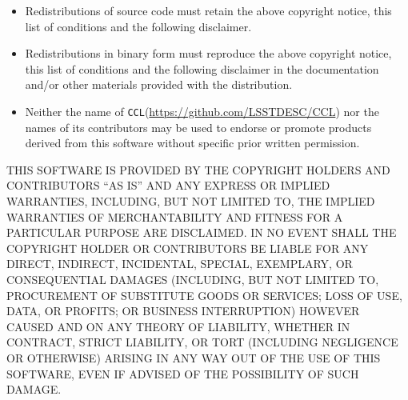 \documentclass[\docopts]{\docclass}
\newcommand{\ccl}{{\tt CCL}\xspace}
\begin{document}
\begin{itemize}
\item Redistributions of source code must retain the above copyright notice, this
  list of conditions and the following disclaimer.
\item Redistributions in binary form must reproduce the above copyright notice,
  this list of conditions and the following disclaimer in the documentation
  and/or other materials provided with the distribution.
\item Neither the name of \ccl (\url{https://github.com/LSSTDESC/CCL}) nor the names of its
  contributors may be used to endorse or promote products derived from
  this software without specific prior written permission.
\end{itemize}

THIS SOFTWARE IS PROVIDED BY THE COPYRIGHT HOLDERS AND CONTRIBUTORS ``AS IS''
AND ANY EXPRESS OR IMPLIED WARRANTIES, INCLUDING, BUT NOT LIMITED TO, THE
IMPLIED WARRANTIES OF MERCHANTABILITY AND FITNESS FOR A PARTICULAR PURPOSE ARE
DISCLAIMED. IN NO EVENT SHALL THE COPYRIGHT HOLDER OR CONTRIBUTORS BE LIABLE
FOR ANY DIRECT, INDIRECT, INCIDENTAL, SPECIAL, EXEMPLARY, OR CONSEQUENTIAL
DAMAGES (INCLUDING, BUT NOT LIMITED TO, PROCUREMENT OF SUBSTITUTE GOODS OR
SERVICES; LOSS OF USE, DATA, OR PROFITS; OR BUSINESS INTERRUPTION) HOWEVER
CAUSED AND ON ANY THEORY OF LIABILITY, WHETHER IN CONTRACT, STRICT LIABILITY,
OR TORT (INCLUDING NEGLIGENCE OR OTHERWISE) ARISING IN ANY WAY OUT OF THE USE
OF THIS SOFTWARE, EVEN IF ADVISED OF THE POSSIBILITY OF SUCH DAMAGE.







\end{document}
